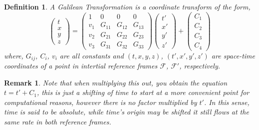 \documentclass[a4paper,12pt,draft]{report}
\newtheorem{remark}{Remark}
\newtheorem{definition}{Definition}
\begin{document}
\begin{definition}
A Galilean Transformation is a coordinate transform of the form,
\begin{equation}
\begin{pmatrix}t\\x\\y\\z\end{pmatrix} =
\begin{pmatrix}
1 & 0 & 0 & 0\\
v_1 & G_{11} & G_{12} & G_{13}\\
v_2 & G_{21} & G_{22} & G_{23}\\
v_3 & G_{31} & G_{32} & G_{33}
\end{pmatrix}
\begin{pmatrix}t'\\x'\\y'\\z'\end{pmatrix} + \begin{pmatrix}C_1\\C_2\\C_3\\C_4\end{pmatrix}
\end{equation}
where, $G_{ij}$, $C_i$, $v_i$ are all constants and $(t, x, y, z)$, $(t', x', y', z')$ are space-time coordinates of a point in intertial reference frames $\mathcal{F}$, $\mathcal{F'}$, respectively.
\end{definition}

\begin{remark}
Note that when multiplying this out, you obtain the equation $t = t' + C_1$, this is just a shifting of time to start at a more convenient point for computational reasons, however there is no factor multiplied by $t'$. In this sense, time is said to be \emph{absolute}, while time's origin may be shifted it still flows at the same rate in both reference frames.
\end{remark}
\end{document}
